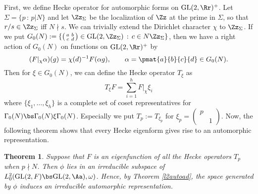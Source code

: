 \documentclass{article}
\newtheorem{theorem}{Theorem}[section]
\newcommand{\GL}{\mathrm{GL}}
\newcommand{\smat}[4]{\left(\begin{smallmatrix} #1 & #2 \\ #3 & #4 \end{smallmatrix}\right)}
\begin{document}
First, we define Hecke operator for automorphic forms on $\GL(2, \Rr)^{+}$. 
Let $\Sigma = \{ p\,:\, p|N\}$ and let $\Zz_{\Sigma}$ be the localization of $\Zz$ at the prime in $\Sigma$, so that $r/s\in \Zz_{\Sigma}$ iff $N\nmid s$. 
We can trivially extend the Dirichlet character $\chi$ to $\Zz_{\Sigma}$. If we put $G_{0}(N) := \{\smat{a}{b}{c}{d}\in \GL(2, \Zz_{\Sigma})\,:\, c\in N\Zz_{\Sigma}\}$, then we have a right action of $G_{0}(N)$ on functions on $\GL(2, \Rr)^{+}$ by 
$$
(F|_{\chi}\alpha)(g) = \chi(d)^{-1}F(\alpha g), \qquad \alpha = \pmat{a}{b}{c}{d} \in G_{0}(N). 
$$
Then for $\xi \in G_{0}(N)$, we can define the Hecke operator $T_{\xi}$ as 
$$
T_{\xi}F = \sum_{i=1}^{h} F|_{\chi}\xi_i
$$
where $\{\xi_{1}, \dots, \xi_{h}\}$ is a complete set of coset representatives for $\Gamma_{0}(N) \bs \Gamma_{0}(N) \xi \Gamma_{0}(N)$. Especially we put $T_{p} := T_{\xi_p}$ for $\xi_{p} = \smat{p}{}{}{1}$.  
Now, the following theorem shows that every Hecke eigenform gives rise to an automorphic representation. 
\begin{theorem}
Suppose that $F$ is an eigenfunction of all the Hecke operators $T_{p}$ when $p\nmid N$. Then $\phi$ lies in an irreducible subspace of $L_{0}^{2}(\GL(2, F) \bs \GL(2, \Aa), \omega)$. Hence, by Theorem \ref{l2autoad}, the space generated by $\phi$ induces an irreducible automorphic representation. 
\end{theorem}
\end{document}
